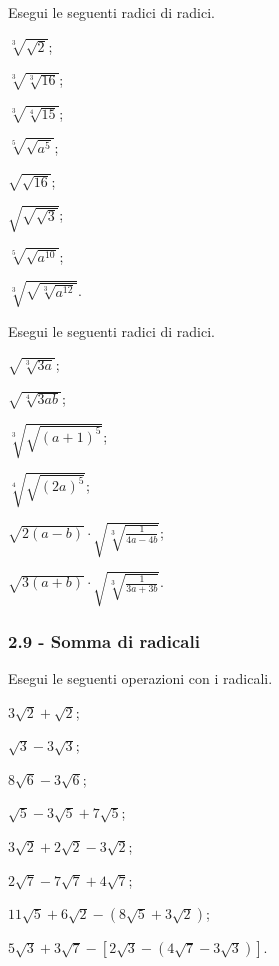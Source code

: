 \begin{esercizio}[\Ast]
 \label{ese:2.48}
Esegui le seguenti radici di radici.
 \begin{multicols}{4}
 \begin{enumeratea}
 \item $\sqrt[3]{\sqrt 2}$;
 \item $\sqrt[3]{\sqrt[3]{16}}$;
 \item $\sqrt[3]{\sqrt[4]{15}}$;
 \item $\sqrt[5]{\sqrt{a^5}}$;
 \item $\sqrt{\sqrt{16}}$;
 \item $\sqrt{\sqrt{\sqrt 3}}$;
 \item $\sqrt[5]{\sqrt{a^{10}}}$;
 \item $\sqrt[3]{\sqrt{\sqrt[3]{a^{12}}}}$.
 \end{enumeratea}
 \end{multicols}
\end{esercizio}

\begin{esercizio}[\Ast]
 \label{ese:2.49}
Esegui le seguenti radici di radici.
\begin{multicols}{2}
 \begin{enumeratea}
 \item $\sqrt{\sqrt[3]{3a}}$;
 \item $\sqrt{\sqrt[4]{3ab}}$;
 \item $\sqrt[3]{\sqrt{(a+1)^5}}$;
 \item $\sqrt[4]{\sqrt{(2a)^5}}$;
 \item $\sqrt{2(a-b)}\cdot \sqrt{\sqrt[3]{\frac 1{4a-4b}}}$;
 \item $\sqrt{3(a+b)}\cdot \sqrt{\sqrt[3]{\frac 1{3a+3b}}}$.
 \end{enumeratea}
 \end{multicols}
\end{esercizio}

\subsubsection*{2.9 - Somma di radicali}

\begin{esercizio}[\Ast]
 \label{ese:2.50}
Esegui le seguenti operazioni con i radicali.
 \begin{multicols}{2}
 \begin{enumeratea}
 \item $3\sqrt 2+\sqrt 2$;
 \item $\sqrt 3-3\sqrt 3$;
 \item $8\sqrt 6-3\sqrt 6$;
 \item $\sqrt 5-3\sqrt 5+7\sqrt 5$;
 \item $3\sqrt 2+2\sqrt 2-3\sqrt 2$;
 \item $2\sqrt 7-7\sqrt 7+4\sqrt 7$;
 \item $11\sqrt 5+6\sqrt 2-(8\sqrt 5+3\sqrt 2)$;
 \item $5\sqrt 3+3\sqrt 7-[2\sqrt 3-(4\sqrt 7-3\sqrt 3)]$.
 \end{enumeratea}
 \end{multicols}
\end{esercizio}

